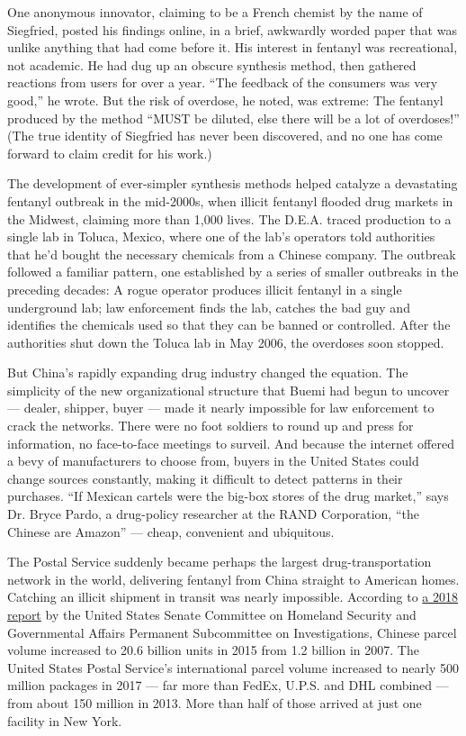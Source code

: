 One anonymous innovator, claiming to be a French chemist by the name of
Siegfried, posted his findings online, in a brief, awkwardly worded
paper that was unlike anything that had come before it. His interest in
fentanyl was recreational, not academic. He had dug up an obscure
synthesis method, then gathered reactions from users for over a year.
``The feedback of the consumers was very good,'' he wrote. But the risk
of overdose, he noted, was extreme: The fentanyl produced by the method
``MUST be diluted, else there will be a lot of overdoses!'' (The true
identity of Siegfried has never been discovered, and no one has come
forward to claim credit for his work.)

The development of ever-simpler synthesis methods helped catalyze a
devastating fentanyl outbreak in the mid-2000s, when illicit fentanyl
flooded drug markets in the Midwest, claiming more than 1,000 lives. The
D.E.A. traced production to a single lab in Toluca, Mexico, where one of
the lab's operators told authorities that he'd bought the necessary
chemicals from a Chinese company. The outbreak followed a familiar
pattern, one established by a series of smaller outbreaks in the
preceding decades: A rogue operator produces illicit fentanyl in a
single underground lab; law enforcement finds the lab, catches the bad
guy and identifies the chemicals used so that they can be banned or
controlled. After the authorities shut down the Toluca lab in May 2006,
the overdoses soon stopped.

But China's rapidly expanding drug industry changed the equation. The
simplicity of the new organizational structure that Buemi had begun to
uncover --- dealer, shipper, buyer --- made it nearly impossible for law
enforcement to crack the networks. There were no foot soldiers to round
up and press for information, no face-to-face meetings to surveil. And
because the internet offered a bevy of manufacturers to choose from,
buyers in the United States could change sources constantly, making it
difficult to detect patterns in their purchases. ``If Mexican cartels
were the big-box stores of the drug market,'' says Dr. Bryce Pardo, a
drug-policy researcher at the RAND Corporation, ``the Chinese are
Amazon'' --- cheap, convenient and ubiquitous.

The Postal Service suddenly became perhaps the largest
drug-transportation network in the world, delivering fentanyl from China
straight to American homes. Catching an illicit shipment in transit was
nearly impossible. According to
\href{https://www.hsgac.senate.gov/imo/media/doc/Combatting\%20the\%20Opioid\%20Crisis\%20-\%20Exploiting\%20Vulnerabilities\%20in\%20International\%20Mail1.pdf}{a
2018 report} by the United States Senate Committee on Homeland Security
and Governmental Affairs Permanent Subcommittee on Investigations,
Chinese parcel volume increased to 20.6 billion units in 2015 from 1.2
billion in 2007. The United States Postal Service's international parcel
volume increased to nearly 500 million packages in 2017 --- far more
than FedEx, U.P.S. and DHL combined --- from about 150 million in 2013.
More than half of those arrived at just one facility in New York.

